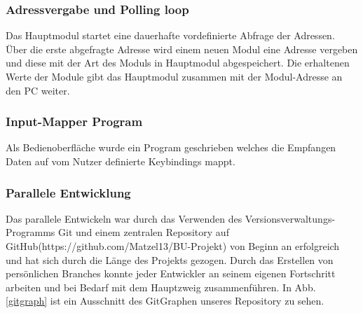 \subsubsection{Adressvergabe und Polling loop}
Das Hauptmodul startet eine dauerhafte vordefinierte Abfrage der Adressen. Über die erste abgefragte Adresse wird einem neuen Modul eine Adresse vergeben und diese mit der Art des Moduls in Hauptmodul abgespeichert. Die erhaltenen Werte der Module gibt das Hauptmodul zusammen mit der Modul-Adresse an den PC weiter.

\subsubsection{Input-Mapper Program}
Als Bedienoberfläche wurde ein Program geschrieben welches die Empfangen Daten auf vom Nutzer definierte Keybindings mappt.

\subsubsection{Parallele Entwicklung}
Das parallele Entwickeln war durch das Verwenden des Versionsverwaltungs-Programms \glqq Git\grqq{} und einem zentralen Repository auf \glqq GitHub\grqq{}(https://github.com/Matzel13/BU-Projekt) von Beginn an erfolgreich und hat sich durch die Länge des Projekts gezogen. Durch das Erstellen von persönlichen \glqq Branches\grqq{} konnte jeder Entwickler an seinem eigenen Fortschritt arbeiten und bei Bedarf mit dem Hauptzweig zusammenführen. In Abb. \ref{gitgraph} ist ein Ausschnitt des GitGraphen unseres Repository zu sehen.

